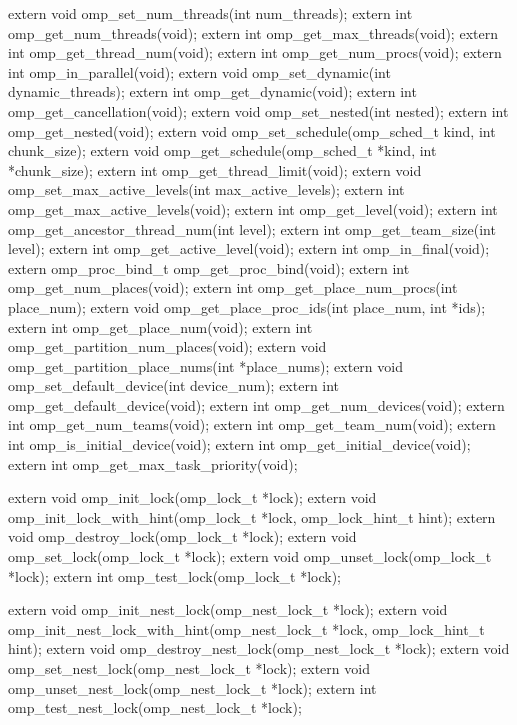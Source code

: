 {\begin{codepar}
extern void omp\_set\_num\_threads(int num\_threads);
extern int omp\_get\_num\_threads(void);
extern int omp\_get\_max\_threads(void);
extern int omp\_get\_thread\_num(void);
extern int omp\_get\_num\_procs(void);
extern int omp\_in\_parallel(void);
extern void omp\_set\_dynamic(int dynamic\_threads);
extern int omp\_get\_dynamic(void);
extern int omp\_get\_cancellation(void);
extern void omp\_set\_nested(int nested);
extern int omp\_get\_nested(void);
extern void omp\_set\_schedule(omp\_sched\_t kind, int chunk\_size);
extern void omp\_get\_schedule(omp\_sched\_t *kind, int *chunk\_size);
extern int omp\_get\_thread\_limit(void);
extern void omp\_set\_max\_active\_levels(int max\_active\_levels);
extern int omp\_get\_max\_active\_levels(void);
extern int omp\_get\_level(void);
extern int omp\_get\_ancestor\_thread\_num(int level);
extern int omp\_get\_team\_size(int level);
extern int omp\_get\_active\_level(void);
extern int omp\_in\_final(void);
extern omp\_proc\_bind\_t omp\_get\_proc\_bind(void);
extern int omp\_get\_num\_places(void);
extern int omp\_get\_place\_num\_procs(int place\_num);
extern void omp\_get\_place\_proc\_ids(int place\_num, int *ids);
extern int omp\_get\_place\_num(void);
extern int omp\_get\_partition\_num\_places(void);
extern void omp\_get\_partition\_place\_nums(int *place\_nums);
extern void omp\_set\_default\_device(int device\_num);
extern int omp\_get\_default\_device(void);
extern int omp\_get\_num\_devices(void);
extern int omp\_get\_num\_teams(void);
extern int omp\_get\_team\_num(void);
extern int omp\_is\_initial\_device(void);
extern int omp\_get\_initial\_device(void);
extern int omp\_get\_max\_task\_priority(void);

extern void omp\_init\_lock(omp\_lock\_t *lock);
extern void omp\_init\_lock\_with\_hint(omp\_lock\_t *lock, 
                                   omp\_lock\_hint\_t hint);
extern void omp\_destroy\_lock(omp\_lock\_t *lock);
extern void omp\_set\_lock(omp\_lock\_t *lock);
extern void omp\_unset\_lock(omp\_lock\_t *lock);
extern int omp\_test\_lock(omp\_lock\_t *lock);

extern void omp\_init\_nest\_lock(omp\_nest\_lock\_t *lock);
extern void omp\_init\_nest\_lock\_with\_hint(omp\_nest\_lock\_t *lock, 
                                          omp\_lock\_hint\_t hint);
extern void omp\_destroy\_nest\_lock(omp\_nest\_lock\_t *lock);
extern void omp\_set\_nest\_lock(omp\_nest\_lock\_t *lock);
extern void omp\_unset\_nest\_lock(omp\_nest\_lock\_t *lock);
extern int omp\_test\_nest\_lock(omp\_nest\_lock\_t *lock);


\end{codepar}}
